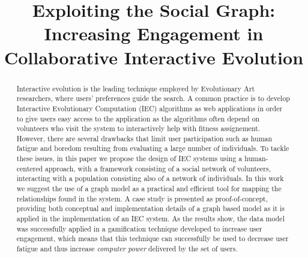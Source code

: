 \documentclass[conference]{IEEEtran}
\begin{document}

\title{Exploiting the Social Graph: Increasing Engagement in Collaborative Interactive Evolution}


\author{
\and
{}
\and
{}
}

\maketitle

\begin{abstract}
Interactive evolution is the leading technique employed by 
Evolutionary Art researchers, where users' preferences guide the search. A common
practice is to develop Interactive Evolutionary Computation (IEC) algorithms
as web applications in order to give users easy access to the
application as the algorithms 
often depend on volunteers who visit the system to interactively help with fitness assignement. 
However, there are several drawbacks that limit user participation 
such as human fatigue and boredom resulting from evaluating 
a large number of individuals. 
To tackle these issues, in this paper we propose the design of IEC systems using a human-centered 
approach, with a framework consisting of a social network of 
volunteers, interacting with a population consisting also of a network 
of individuals. In this work we suggest the use of a graph model as a practical 
and efficient tool for mapping the relationships 
found in the system. A case study is presented as proof-of-concept, 
providing both conceptual and implementation details of a graph based model 
as it is  applied in the implementation of an IEC system. 
As the results show, the data model was successfully applied in a gamification technique 
developed to increase user engagement, which means that this technique can successfully be used to
decrease user fatigue and thus increase {\em computer power}
delivered by the set of users.


\end{abstract}
\end{document}
